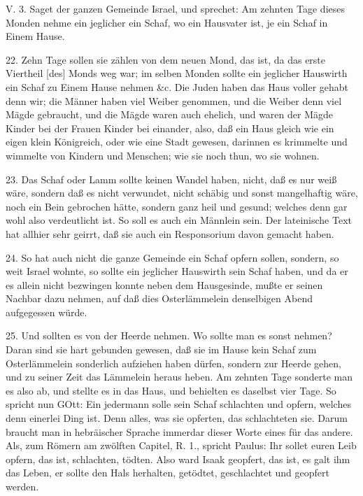 \begin{schriftzitat}
V. 3. Saget der ganzen Gemeinde Israel, und sprechet: Am zehnten Tage dieses Monden nehme ein jeglicher ein Schaf, wo ein Hausvater ist, je ein Schaf in Einem Hause.
\end{schriftzitat}

22. Zehn Tage sollen sie zählen von dem neuen Mond, das ist, da das erste Viertheil [des] Monds weg war; im selben Monden sollte ein jeglicher Hauswirth ein Schaf zu Einem Hause nehmen \&c. Die Juden haben das Haus voller gehabt denn wir; die Männer haben viel Weiber genommen, und die Weiber denn viel Mägde gebraucht, und die Mägde waren auch ehelich, und waren der Mägde Kinder bei der Frauen Kinder bei einander, also, daß ein Haus gleich wie ein eigen klein Königreich, oder wie eine Stadt gewesen, darinnen es krimmelte und wimmelte von Kindern und Menschen; wie sie noch thun, wo sie wohnen.

23. Das Schaf oder Lamm sollte keinen Wandel haben, nicht, daß es nur weiß wäre, sondern daß es nicht verwundet, nicht schäbig und sonst mangelhaftig wäre, noch ein Bein gebrochen hätte, sondern ganz heil und gesund; welches denn gar wohl also verdeutlicht ist. So soll es auch ein Männlein sein. Der lateinische Text hat allhier sehr geirrt, daß sie auch ein Responsorium davon gemacht haben.

24. So hat auch nicht die ganze Gemeinde ein Schaf opfern sollen, sondern, so weit Israel wohnte, so sollte ein jeglicher Hauswirth sein Schaf haben, und da er es allein nicht bezwingen konnte neben dem Hausgesinde, mußte er seinen Nachbar dazu nehmen, auf daß dies Osterlämmelein denselbigen Abend aufgegessen würde.

25. Und sollten es von der Heerde nehmen. Wo sollte man es sonst nehmen? Daran sind sie hart gebunden gewesen, daß sie im Hause kein Schaf zum Osterlämmelein sonderlich aufziehen haben dürfen, sondern zur Heerde gehen, und zu seiner Zeit das Lämmelein heraus heben. Am zehnten Tage sonderte man es also ab, und stellte es in das Haus, und behielten es daselbst vier Tage. So spricht nun GOtt: Ein jedermann solle sein Schaf schlachten und opfern, welches denn einerlei Ding ist. Denn alles, was sie opferten, das schlachteten sie. Darum braucht man in hebräischer Sprache immerdar dieser Worte eines für das andere. Als, zum Römern am zwölften Capitel, R. 1., spricht Paulus: Ihr sollet euren Leib opfern, das ist, schlachten, tödten. Also ward Isaak geopfert, das ist, es galt ihm das Leben, er sollte den Hals herhalten, getödtet, geschlachtet und geopfert werden.

